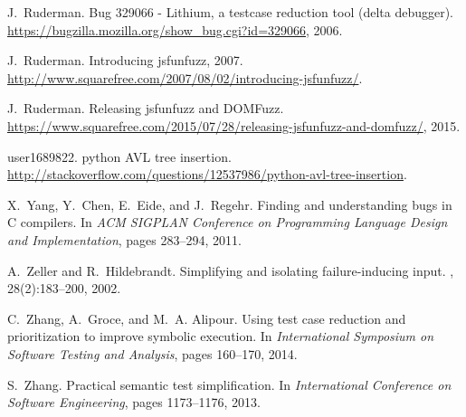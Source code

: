\documentclass[sigconf]{acmart}
\begin{document}
\begin{thebibliography}{10}
J.~Ruderman.
\newblock Bug 329066 - {Lithium}, a testcase reduction tool (delta debugger).
\newblock \url{https://bugzilla.mozilla.org/show_bug.cgi?id=329066}, 2006.

J.~Ruderman.
\newblock Introducing jsfunfuzz, 2007.
\newblock \url{http://www.squarefree.com/2007/08/02/introducing-jsfunfuzz/}.

J.~Ruderman.
\newblock Releasing jsfunfuzz and {DOMFuzz}.
\newblock
  \url{https://www.squarefree.com/2015/07/28/releasing-jsfunfuzz-and-domfuzz/},
  2015.

user1689822.
\newblock python {AVL} tree insertion.
\newblock
  \url{http://stackoverflow.com/questions/12537986/python-avl-tree-insertion}.

X.~Yang, Y.~Chen, E.~Eide, and J.~Regehr.
\newblock Finding and understanding bugs in {C} compilers.
\newblock In {\em ACM SIGPLAN Conference on Programming Language Design and
  Implementation}, pages 283--294, 2011.

A.~Zeller and R.~Hildebrandt.
\newblock Simplifying and isolating failure-inducing input.
, 28(2):183--200,
  2002.

C.~Zhang, A.~Groce, and M.~A. Alipour.
\newblock Using test case reduction and prioritization to improve symbolic
  execution.
\newblock In {\em International Symposium on Software Testing and Analysis},
  pages 160--170, 2014.

S.~Zhang.
\newblock Practical semantic test simplification.
\newblock In {\em International Conference on Software Engineering}, pages
  1173--1176, 2013.

\end{thebibliography}
\end{document}
